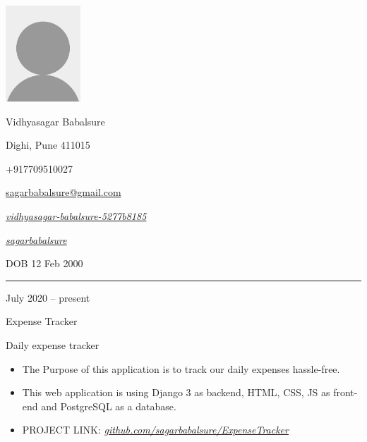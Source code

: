 \documentclass[a4paper,10pt]{article}
\newlength{\cvcolumngapwidth}
\newlength{\cvleftcolumnwidth}
\newlength{\cvrightcolumnwidth}
\newcommand{\cvnamestyle}[1]{{\Large\cvnamefont\textcolor{cvnamecolor}{#1}}}
\newcommand{\cvsectionstyle}[1]{{\normalsize\cvsectionfont\textcolor{cvsectioncolor}{#1}}}
\newcommand{\cvtitlestyle}[1]{{\large\cvtitlefont\textcolor{cvtitlecolor}{#1}}}
\newcommand{\cvdurationstyle}[1]{{\small\cvdurationfont\textcolor{cvdurationcolor}{#1}}}
\newlength{\cvafteritemskipamount}
\newlength{\cvaftersectionskipamount}
\newlength{\cvafternameskipamount}
\newlength{\cvafterpersonalinfolineskipamount}
\newlength{\cvaftertitleskipamount}
\newlength{\cvparskip}
\newcommand{\cvpersonalinfo}[2]{
    \begin{minipage}[t]{\cvleftcolumnwidth}
        \vspace{0mm} %
        \raggedleft #1
    \end{minipage}%
    \hspace{\cvcolumngapwidth}%
    \begin{minipage}[t]{\cvrightcolumnwidth}
        \vspace{0mm} %
        #2
    \end{minipage}

    \vspace{\cvafteritemskipamount}
}
\newcommand{\cvname}[1]{
    \cvnamestyle{#1}

    \vspace{\cvafternameskipamount}
}
\newcommand{\cvpersonalinfolinewithicon}[3]{
    \raisebox{.5\fontcharht\font`E-.5\height}{\texttt{[image: \#2]}}
    #3

    \vspace{\cvafterpersonalinfolineskipamount}
}
\newcommand{\cvsection}[1]{
    \begin{minipage}[t]{\cvleftcolumnwidth}
        \raggedleft\cvsectionstyle{#1}
    \end{minipage}%
    \hspace{\cvcolumngapwidth}%
    \begin{minipage}[t]{\cvrightcolumnwidth}
        \textcolor{cvrulecolor}{\rule{\cvrightcolumnwidth}{0.3mm}}
    \end{minipage}

    \vspace{\cvaftersectionskipamount}
}
\newcommand{\cvitem}[2]{
    \begin{minipage}[t]{\cvleftcolumnwidth}
        \raggedleft #1
    \end{minipage}%
    \hspace{\cvcolumngapwidth}%
    \begin{minipage}[t]{\cvrightcolumnwidth}
        \setlength{\parskip}{\cvparskip} #2
    \end{minipage}

    \vspace{\cvafteritemskipamount}
}
\newcommand{\cvtitle}[1]{
    \cvtitlestyle{#1}

    \vspace{\cvaftertitleskipamount}
    \vspace{-\cvparskip}
}
\begin{document}

\cvpersonalinfo{
    \includegraphics[height=36mm]{photo.png}
}{
    \cvname{Vidhyasagar Babalsure}

    \cvpersonalinfolinewithicon{height=4mm}{072-location.pdf}{
        Dighi, Pune 411015 
    }

    \cvpersonalinfolinewithicon{height=4mm}{067-phone.pdf}{
        +917709510027
    }

    \cvpersonalinfolinewithicon{height=4mm}{070-envelop.pdf}{
        \href{mailto:sagarbabalsure@gmail.com}{sagarbabalsure@gmail.com}
    }

    \cvpersonalinfolinewithicon{height=4mm}{458-linkedin.pdf}{
       \textit{\href{https://www.linkedin.com/in/vidhyasagar-babalsure-5277b8185/}{vidhyasagar-babalsure-5277b8185}}
        
    }
    
    \cvpersonalinfolinewithicon{height=4mm}{github.pdf}{
        \textit{\href{https://github.com/sagarbabalsure}{sagarbabalsure}}
    }

    DOB 12 Feb 2000
}



\cvsection{PROJECTS}

\cvitem{
    \cvdurationstyle{July 2020 -- present}
}{
    \cvtitle{Expense Tracker}

    Daily expense tracker 

    \begin{itemize}[leftmargin=*]
        \item The Purpose of this application is to track our daily expenses hassle-free.
        \item This web application is using Django 3 as backend, HTML, CSS, JS as front-end and PostgreSQL as a database.
        \item PROJECT LINK: 
         \textit{\href{https://github.com/sagarbabalsure/ExpenseTracker}{github.com/sagarbabalsure/ExpenseTracker}}
    \end{itemize}
 }
\end{document}
